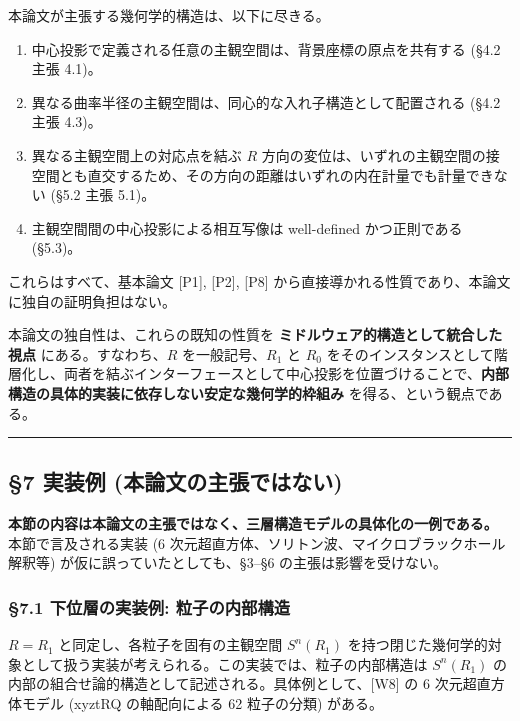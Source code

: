 \documentclass[
  a4paper,11pt]{ltjsarticle}
\providecommand{\tightlist}{%
  \setlength{\itemsep}{0pt}\setlength{\parskip}{0pt}}
\begin{document}
本論文が主張する幾何学的構造は、以下に尽きる。

\begin{enumerate}
\def\labelenumi{\arabic{enumi}.}
\tightlist
\item
  中心投影で定義される任意の主観空間は、背景座標の原点を共有する (§4.2
  主張 4.1)。
\item
  異なる曲率半径の主観空間は、同心的な入れ子構造として配置される (§4.2
  主張 4.3)。
\item
  異なる主観空間上の対応点を結ぶ \(R\)
  方向の変位は、いずれの主観空間の接空間とも直交するため、その方向の距離はいずれの内在計量でも計量できない
  (§5.2 主張 5.1)。
\item
  主観空間間の中心投影による相互写像は well-defined かつ正則である
  (§5.3)。
\end{enumerate}

これらはすべて、基本論文 {[}P1{]}, {[}P2{]}, {[}P8{]}
から直接導かれる性質であり、本論文に独自の証明負担はない。

本論文の独自性は、これらの既知の性質を
\textbf{ミドルウェア的構造として統合した視点} にある。すなわち、\(R\)
を一般記号、\(R_1\) と \(R_0\)
をそのインスタンスとして階層化し、両者を結ぶインターフェースとして中心投影を位置づけることで、\textbf{内部構造の具体的実装に依存しない安定な幾何学的枠組み}
を得る、という観点である。

\begin{center}\rule{0.5\linewidth}{0.5pt}\end{center}

\subsection{§7 実装例
(本論文の主張ではない)}\label{ux5b9fux88c5ux4f8b-ux672cux8ad6ux6587ux306eux4e3bux5f35ux3067ux306fux306aux3044}

\textbf{本節の内容は本論文の主張ではなく、三層構造モデルの具体化の一例である。}
本節で言及される実装 (6
次元超直方体、ソリトン波、マイクロブラックホール解釈等)
が仮に誤っていたとしても、§3--§6 の主張は影響を受けない。

\subsubsection{§7.1 下位層の実装例:
粒子の内部構造}\label{ux4e0bux4f4dux5c64ux306eux5b9fux88c5ux4f8b-ux7c92ux5b50ux306eux5185ux90e8ux69cbux9020}

\(R = R_1\) と同定し、各粒子を固有の主観空間 \(S^n(R_1)\)
を持つ閉じた幾何学的対象として扱う実装が考えられる。この実装では、粒子の内部構造は
\(S^n(R_1)\)
の内部の組合せ論的構造として記述される。具体例として、{[}W8{]} の 6
次元超直方体モデル (xyztRQ の軸配向による 62 粒子の分類) がある。
\end{document}
